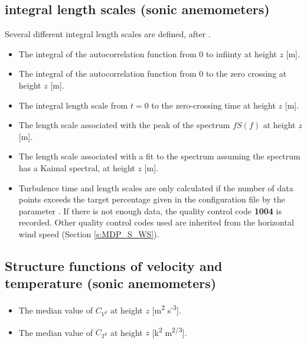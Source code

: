 \subsection{integral length scales (sonic anemometers)}  
Several different integral length scales are defined, after \cite{Pichugina_2008_a}.
\begin{itemize}
\item {} The integral of the autocorrelation function from 0 to infiinty at height $z$ [m].
\item {} The integral of the autocorrelation function from 0 to the zero crossing at height $z$ [m].
\item {} The integral length scale from $t= 0$ to the zero-crossing time at height $z$ [m]. %
\item {} The length scale associated with the peak of the spectrum $fS(f)$ at height $z$ [m].
\item {} The length scale associated with a fit to the spectrum assuming the spectrum has a Kaimal spectral, at height $z$ [m].
\item {} Turbulence time and length scales are only calculated if the number of data points exceeds the target percentage given in the configuration file by the parameter . If there is not enough data, the quality control code \textbf{1004} is recorded. Other quality control codes used are inherited from the horizontal wind speed (Section \ref{s:MDP_S_WS}).
\end{itemize}

\subsection{Structure functions of velocity and temperature (sonic anemometers)}  
\begin{itemize}
\item {} The median value of $C_{V^2}$ at height $z$ [m\textsuperscript{2} s\textsuperscript{-3}]. 
\item {} The median value of $C_{T^2}$ at height $z$ [k\textsuperscript{2} m\textsuperscript{2/3}]. %
\end{itemize}

